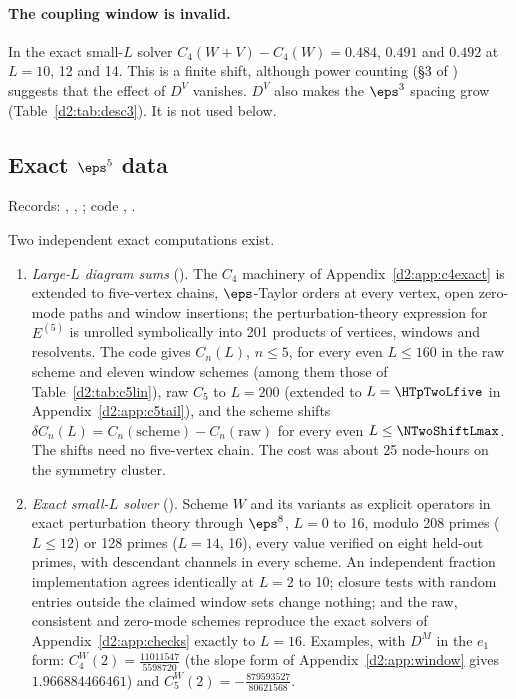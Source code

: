 \paragraph{The coupling window is invalid.} In the exact small-$L$ solver $C_4(W{+}V)-C_4(W)=0.484$, $0.491$ and $0.492$ at
$L=10$, 12 and 14. This is a finite shift, although power counting (\S3 of ) suggests that the effect
of $D^V$ vanishes. $D^V$ also makes the $\eps^3$ spacing grow (Table~\ref{d2:tab:desc3}). It is
not used below.

\subsection{Exact \texorpdfstring{$\eps^5$}{eps5} data}\label{d2:app:eps5data}
{\small\raggedright\noindent Records: ,
, ; code
, .\par}

Two independent exact computations exist.
\begin{enumerate}
\item \emph{Large-$L$ diagram sums} (). The $C_4$ machinery of Appendix~\ref{d2:app:c4exact} is
 extended to five-vertex chains, $\eps$-Taylor orders at every vertex, open zero-mode paths and window insertions;
 the perturbation-theory expression for $E^{(5)}$ is unrolled symbolically into 201 products of vertices, windows and
 resolvents. The code gives $C_n(L)$, $n\le5$, for every even $L\le160$ in the raw scheme and eleven window schemes (among
 them those of Table~\ref{d2:tab:c5lin}), raw $C_5$ to $L=200$ (extended to $L=\HTpTwoLfive$ in
 Appendix~\ref{d2:app:c5tail}), and the scheme shifts $\delta C_n(L)=C_n(\text{scheme})-C_n(\text{raw})$ for every even
 $L\le\NTwoShiftLmax$. The shifts need no five-vertex chain. The cost was about 25 node-hours on the symmetry cluster.
\item \emph{Exact small-$L$ solver} (). Scheme $W$ and its variants as explicit operators in exact
 perturbation theory through $\eps^8$, $L=0$ to 16, modulo 208 primes ($L\le12$) or 128 primes ($L=14$, 16), every value
 verified on eight held-out primes, with descendant channels in every scheme. An independent fraction implementation agrees
 identically at $L=2$ to 10; closure tests with random entries outside the claimed window sets change nothing; and the raw,
 consistent and zero-mode schemes reproduce the exact solvers of Appendix~\ref{d2:app:checks} exactly to $L=16$. Examples,
 with $D^M$ in the $e_1$ form: $C_4^W(2)=\frac{11011547}{5598720}$ (the slope form of Appendix~\ref{d2:app:window} gives
 $1.966884466461$) and $C_5^W(2)=-\frac{879593527}{80621568}$.
\end{enumerate}

